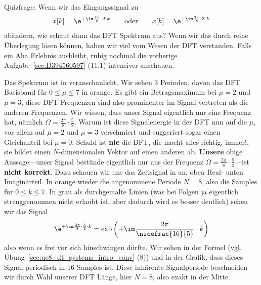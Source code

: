 \begin{ExCalc}
Quizfrage: Wenn wir das Eingangssignal zu
\begin{align}
x[k] = \e^{+\im \frac{2\pi}{8} \cdot 2 \cdot k}
\qquad\text{oder}\qquad
x[k] = \e^{+\im \frac{2\pi}{8} \cdot 3 \cdot k}
\end{align}
abändern, wie schaut dann das DFT Spektrum aus? Wenn wir das durch reine
Überlegung lösen können, haben wir viel vom Wesen der DFT
verstanden.
%
Falls ein Aha Erlebnis ausbleibt, ruhig nochmal die vorherige Aufgabe~\ref{sec:D394560597} (11.1)
intensiver anschauen.

\end{ExCalc}

\begin{Loesung}
%
%
Das Spektrum ist in  veranschaulicht. Wir sehen
3 Perioden, davon das DFT Basisband für $0\leq \mu \leq 7$ in orange.
Es gibt ein Betragsmaximum bei $\mu=2$ und $\mu=3$, diese DFT Frequenzen sind
also prominenter im Signal vertreten als die anderen Frequenzen.
%
Wir wissen, dass unser Signal eigentlich nur eine Frequenz hat, nämlich
$\Omega=\frac{2\pi}{8}\cdot\frac{5}{2}$.
Warum ist diese Signalenergie in der DFT nun auf die $\mu$, vor allem auf $\mu=2$ und
$\mu=3$  verschmiert und suggeriert sogar einen Gleichanteil bei $\mu=0$.
%
Schuld ist \textbf{nie} die DFT, die macht alles richtig, immer!, sie bildet
einen $N$-dimensionalen Vektor auf einen anderen ab.
%
\textbf{Unsere} obige Aussage---unser Signal bestünde eigentlich nur aus der Frequenz
$\Omega=\frac{2\pi}{8}\cdot\frac{5}{2}$---ist \textbf{nicht korrekt}.
Dazu schauen wir uns das Zeitsignal in  an, oben
Real- unten Imaginärteil. In orange wieder die angenommene Periode $N=8$, also
die Samples für $0 \leq k \leq 7$.
In grau als durchgemalte Linien (was bei Folgen ja eigentlich strenggenommen
nicht erlaubt ist, aber dadurch wird es besser deutlich) sehen wir das Signal
\begin{align}
\e^{+\im \frac{2\pi}{8} \cdot \frac{5}{2} \cdot k} =
\exp\left(+\im \frac{2\pi}{\nicefrac{16}{5}} \cdot k\right)
\end{align}
also wenn es frei vor sich hinschwingen dürfte.
Wir sehen in der Formel (vgl. Übung~\ref{sec:ue8_dt_systems_intro_conv} (8))
und in der Grafik, dass dieses Signal periodisch in 16 Samples ist.
%
Diese inhärente Signalperiode beschneiden wir durch Wahl unserer DFT Länge,
hier $N=8$, also exakt in der Mitte.

\end{Loesung}
